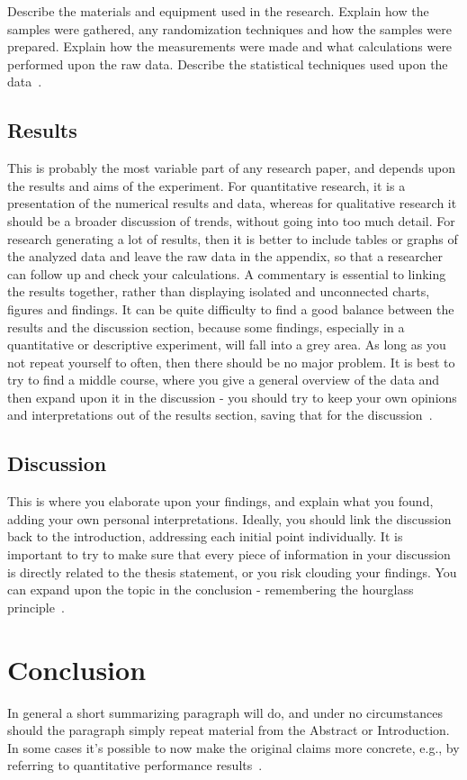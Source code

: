 \documentclass{winslabreport}
\begin{document}
Describe the materials and equipment used in the research. Explain how the samples were gathered, any randomization techniques and how the samples were prepared. Explain how the measurements were made and what calculations were performed upon the raw data. Describe the statistical techniques used upon the data~\cite{Shuttleworth2016}.


\subsection{Results}
This is probably the most variable part of any research paper, and depends upon the results and aims of the experiment. For quantitative research, it is a presentation of the numerical results and data, whereas for qualitative research it should be a broader discussion of trends, without going into too much detail. For research generating a lot of results, then it is better to include tables or graphs of the analyzed data and leave the raw data in the appendix, so that a researcher can follow up and check your calculations. A commentary is essential to linking the results together, rather than displaying isolated and unconnected charts, figures and findings. It can be quite difficulty to find a good balance between the results and the discussion section, because some findings, especially in a quantitative or descriptive experiment, will fall into a grey area. As long as you not repeat yourself to often, then there should be no major problem. It is best to try to find a middle course, where you give a general overview of the data and then expand upon it in the discussion - you should try to keep your own opinions and interpretations out of the results section, saving that for the discussion~\cite{Shuttleworth2016}.

\subsection{Discussion}
This is where you elaborate upon your findings, and explain what you found, adding your own personal interpretations. Ideally, you should link the discussion back to the introduction, addressing each initial point individually. It is important to try to make sure that every piece of information in your discussion is directly related to the thesis statement, or you risk clouding your findings. You can expand upon the topic in the conclusion - remembering the hourglass principle~\cite{Shuttleworth2016}.


\section{Conclusion}
In general a short summarizing paragraph will do, and under no circumstances should the paragraph simply repeat material from the Abstract or Introduction. In some cases it's possible to now make the original claims more concrete, e.g., by referring to quantitative performance results~\cite{Widom2006}.
\end{document}
